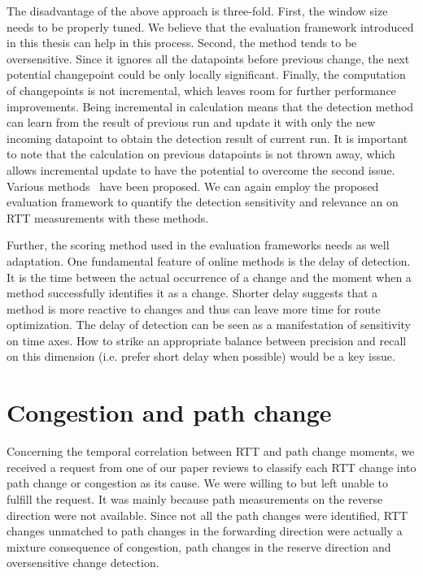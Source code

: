 The disadvantage of the above approach is three-fold. First, the window size needs to be properly tuned. We believe that the evaluation framework introduced in this thesis can help in this process. 
Second, the method tends to be oversensitive. Since it ignores all the datapoints before previous change, the next potential changepoint could be only locally significant. Finally, the computation of changepoints is not incremental, which leaves room for further performance improvements. Being incremental in calculation means that the detection method can learn from the result of previous run and update it with only the new incoming datapoint to obtain the detection result of current run. 
It is important to note that the calculation on previous datapoints is not thrown away, which allows incremental update to have the potential to overcome the second issue.
Various methods~\cite{Caron2012,Turner2009a,Sharkey2014,Ho2014,Adams2007,Conditions2015} have been proposed. We can again employ the proposed evaluation framework to quantify the detection sensitivity and relevance an on RTT measurements with these methods.

Further, the scoring method used in the evaluation frameworks needs as well adaptation.
One fundamental feature of online methods is the delay of detection. It is the time between the actual occurrence of a change and the moment when a method successfully identifies it as a change. Shorter delay suggests that a method is more reactive to changes and thus can leave more time for route optimization. The delay of detection can be seen as a manifestation of sensitivity on time axes. How to strike an appropriate balance between precision and recall on this dimension (i.e. prefer short delay when possible) would be a key issue.

\section{Congestion and path change}
Concerning the temporal correlation between RTT and path change moments, we received a request from one of our paper reviews to classify each RTT change into path change or congestion as its cause. We were willing to but left unable to fulfill the request.
It was mainly because path measurements on the reverse direction were not available. Since not all the path changes were identified, RTT changes unmatched to path changes in the forwarding direction were actually a mixture consequence of congestion, path changes in the reserve direction and oversensitive change detection.

